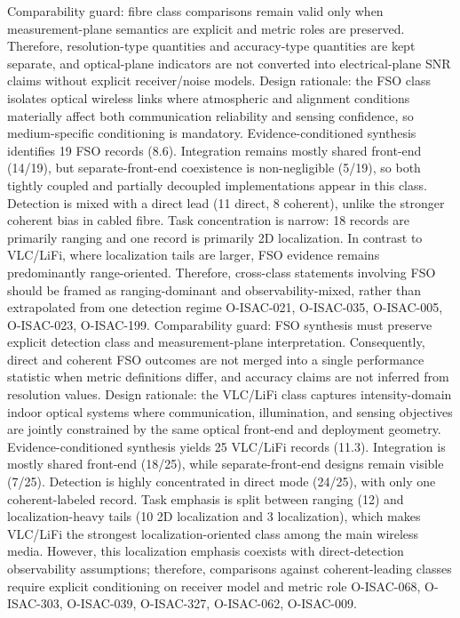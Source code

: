 {}Comparability guard: fibre class comparisons remain valid only when measurement-plane semantics are explicit and metric roles are preserved. Therefore, resolution-type quantities and accuracy-type quantities are kept separate, and optical-plane indicators are not converted into electrical-plane SNR claims without explicit receiver/noise models.\markdownRendererInterblockSeparator
{}
\markdownRendererSectionEnd \markdownRendererSectionBegin
{}\markdownRendererInterblockSeparator
{}Design rationale: the FSO class isolates optical wireless links where atmospheric and alignment conditions materially affect both communication reliability and sensing confidence, so medium-specific conditioning is mandatory.\markdownRendererParagraphSeparator
{}Evidence-conditioned synthesis identifies 19 FSO records (8.6\markdownRendererPercentSign{}). Integration remains mostly shared front-end (14/19), but separate-front-end coexistence is non-negligible (5/19), so both tightly coupled and partially decoupled implementations appear in this class. Detection is mixed with a direct lead (11 direct, 8 coherent), unlike the stronger coherent bias in cabled fibre. Task concentration is narrow: 18 records are primarily ranging and one record is primarily 2D localization. In contrast to VLC/LiFi, where localization tails are larger, FSO evidence remains predominantly range-oriented. Therefore, cross-class statements involving FSO should be framed as ranging-dominant and observability-mixed, rather than extrapolated from one detection regime O-ISAC-021, O-ISAC-035, O-ISAC-005, O-ISAC-023, O-ISAC-199.\markdownRendererParagraphSeparator
{}Comparability guard: FSO synthesis must preserve explicit detection class and measurement-plane interpretation. Consequently, direct and coherent FSO outcomes are not merged into a single performance statistic when metric definitions differ, and accuracy claims are not inferred from resolution values.\markdownRendererInterblockSeparator
{}
\markdownRendererSectionEnd \markdownRendererSectionBegin
{}\markdownRendererInterblockSeparator
{}Design rationale: the VLC/LiFi class captures intensity-domain indoor optical systems where communication, illumination, and sensing objectives are jointly constrained by the same optical front-end and deployment geometry.\markdownRendererParagraphSeparator
{}Evidence-conditioned synthesis yields 25 VLC/LiFi records (11.3\markdownRendererPercentSign{}). Integration is mostly shared front-end (18/25), while separate-front-end designs remain visible (7/25). Detection is highly concentrated in direct mode (24/25), with only one coherent-labeled record. Task emphasis is split between ranging (12) and localization-heavy tails (10 2D localization and 3 localization), which makes VLC/LiFi the strongest localization-oriented class among the main wireless media. However, this localization emphasis coexists with direct-detection observability assumptions; therefore, comparisons against coherent-leading classes require explicit conditioning on receiver model and metric role O-ISAC-068, O-ISAC-303, O-ISAC-039, O-ISAC-327, O-ISAC-062, O-ISAC-009.\markdownRendererParagraphSeparator
